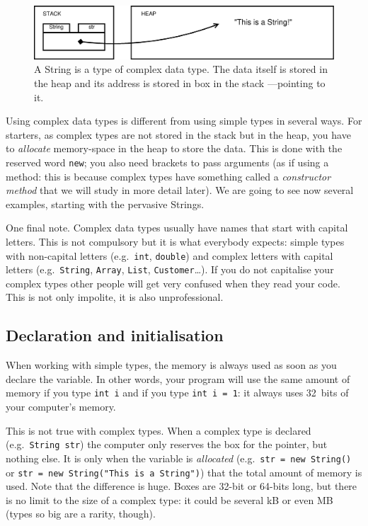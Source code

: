 \begin{figure}[htbp]
  \centering
  \includegraphics[width=\textwidth]{gfx/variables-string}
  \caption{A String is a type of complex data type. The data itself is
    stored in the heap and its address is stored in box in the stack
    ---pointing to it. }
  \label{fig:compledata}
\end{figure}

Using complex data types is different from using simple types in
several ways. For starters, as complex types are not stored in the
stack but in the heap, you have to \emph{allocate} memory-space in the
heap to store the data. This is done with the reserved word
\verb+new+; you also need brackets to pass arguments (as if using a
method: this is because complex types have something called a
\emph{constructor method} that we will study in more detail later). We are
going to see now several examples, starting with the pervasive
Strings. 

One final note. Complex data types usually have names that start with capital
letters. This is not compulsory but it is what everybody expects:
simple types with non-capital letters (e.g.~\verb+int+, \verb+double+)
and complex letters with capital letters (e.g.~\verb+String+,
\verb+Array+, \verb+List+, \verb+Customer+\ldots). If you do not
capitalise your complex types other people will get very confused when
they read your code. This is not only impolite, it is also
unprofessional. 

\subsection{Declaration and initialisation}
\label{sec:decl-init}

When working with simple types, the memory is always used as soon as
you declare the variable. In other words, your program will use the
same amount of memory if you type \verb+int i+ and if you type
\verb+int i = 1+: it always uses 32~bits of your computer's memory. 

This is not true with complex types. When a complex type is declared
(e.g.~\verb+String str+) the computer only reserves the box for the pointer,
but nothing else. It is only when the variable is \emph{allocated}
(e.g.~\verb+str = new String()+ 
or \verb+str = new String("This is a String")+) that the total amount
of memory is used. Note that the difference is huge. Boxes are 32-bit
or 64-bits long, but there is no limit to the size of a complex type:
it could be several kB or even MB (types so big are a rarity,
though). 

